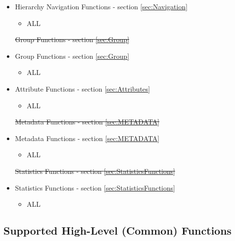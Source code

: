 \documentclass[12pt]{report} %
\providecommand{\DIFdeltex}[1]{{\protect\color{red}\sout{#1}}}                      %
\providecommand{\DIFaddbegin}{} %
\providecommand{\DIFaddend}{} %
\providecommand{\DIFdelbegin}{} %
\providecommand{\DIFdelend}{} %
\providecommand{\DIFdel}[1]{\texorpdfstring{\DIFdeltex{#1}}{}} %
\newcommand{\DIFscaledelfig}{0.5}
\newlength{\DIFdelgraphicswidth} %
\newlength{\DIFdelgraphicsheight} %
\newcommand{\DIFaddincludegraphics}[2][]{{\color{blue}\fbox{\DIFOincludegraphics[#1]{#2}}}} %
\newcommand{\DIFdelincludegraphics}[2][]{%
\sbox{\DIFdelgraphicsbox}{\DIFOincludegraphics[#1]{#2}}%
\settoboxwidth{\DIFdelgraphicswidth}{\DIFdelgraphicsbox} %
\settoboxtotalheight{\DIFdelgraphicsheight}{\DIFdelgraphicsbox} %
\scalebox{\DIFscaledelfig}{%
\parbox[b]{\DIFdelgraphicswidth}{\usebox{\DIFdelgraphicsbox}\\[-\baselineskip] \rule{\DIFdelgraphicswidth}{0em}}\llap{\resizebox{\DIFdelgraphicswidth}{\DIFdelgraphicsheight}{%
\setlength{\unitlength}{\DIFdelgraphicswidth}%
\begin{picture}(1,1)%
\thicklines\linethickness{2pt} %
{\color[rgb]{1,0,0}\put(0,0){\framebox(1,1){}}}%
{\color[rgb]{1,0,0}\put(0,0){\line( 1,1){1}}}%
{\color[rgb]{1,0,0}\put(0,1){\line(1,-1){1}}}%
\end{picture}%
}\hspace*{3pt}}} %
} %
\DeclareRobustCommand{\DIFaddbegin}{\DIFOaddbegin \let\includegraphics\DIFaddincludegraphics} %
\DeclareRobustCommand{\DIFaddend}{\DIFOaddend \let\includegraphics\DIFOincludegraphics} %
\DeclareRobustCommand{\DIFdelbegin}{\DIFOdelbegin \let\includegraphics\DIFdelincludegraphics} %
\DeclareRobustCommand{\DIFdelend}{\DIFOaddend \let\includegraphics\DIFOincludegraphics} %
\begin{document}
\begin{itemize}[noitemsep,nolistsep] 
	\item{Hierarchy Navigation Functions - section \ref{sec:Navigation}}
		\begin{itemize}[noitemsep,nolistsep] 
			\item{ALL}
		\end{itemize}
	\DIFdelbegin %
\DIFdel{Group Functions - section \ref{sec:Group}
	}\DIFdelend \DIFaddbegin \item{Group Functions - section \ref{sec:Group}}
		\DIFaddend \begin{itemize}[noitemsep,nolistsep] 
			\item{ALL}
		\end{itemize}
	\item{Attribute Functions - section \ref{sec:Attributes}}
		\begin{itemize}[noitemsep,nolistsep] 
			\item{ALL}
		\end{itemize}
	\DIFdelbegin %
\DIFdel{Metadata Functions - section \ref{sec:METADATA}
	}\DIFdelend \DIFaddbegin \item{Metadata Functions - section \ref{sec:METADATA}}
		\DIFaddend \begin{itemize}[noitemsep,nolistsep] 
			\item{ALL}
		\end{itemize}
	\DIFdelbegin %
\DIFdel{Statistics Functions - section \ref{sec:StatisticsFunctions}
	}\DIFdelend \DIFaddbegin \item{Statistics Functions - section \ref{sec:StatisticsFunctions}}
		\DIFaddend \begin{itemize}[noitemsep,nolistsep] 
			\item{ALL}
		\end{itemize}
\end{itemize}


\subsection{Supported High-Level (Common) Functions}\label{sec:MCHWHighLevel}

\end{document}
